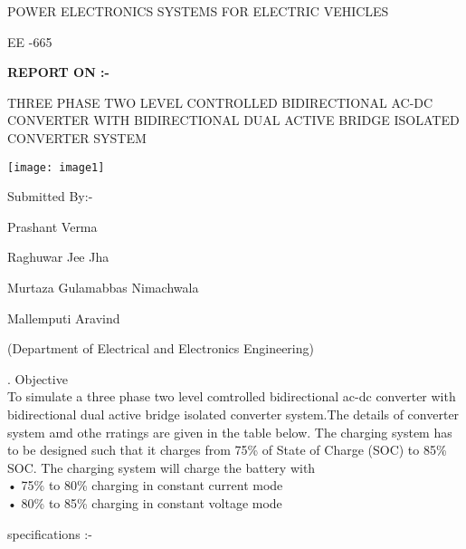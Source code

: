 \documentclass{article} %
\begin{document}
\begin{center}
\Large\noindent POWER ELECTRONICS SYSTEMS FOR ELECTRIC VEHICLES
\begin{center}
EE -665
\end{center}

\large
\noindent \textbf{  REPORT ON :- }

\noindent THREE PHASE TWO LEVEL CONTROLLED BIDIRECTIONAL AC-DC CONVERTER WITH BIDIRECTIONAL DUAL ACTIVE BRIDGE ISOLATED CONVERTER SYSTEM
\begin{center}
\texttt{[image: image1]}
\end{center}

\noindent Submitted By:-

\noindent Prashant Verma 
                        
                                          
\noindent Raghuwar Jee Jha


\noindent Murtaza Gulamabbas Nimachwala 


\noindent  Mallemputi Aravind




\noindent   (Department of Electrical and Electronics Engineering)\\
\end{center}

\newpage

\Large{}. Objective\\
\noindent To simulate a three phase two level comtrolled  bidirectional ac-dc converter with bidirectional dual active bridge isolated converter system.The details of converter system amd othe rratings are given in the table below. The charging system has to be designed such that it charges from 75\% of State of Charge (SOC) to 85\% SOC. The charging system will charge the battery with\\
• 75\% to 80\% charging in constant current mode\\
• 80\% to 85\% charging in constant voltage mode  

\noindent specifications :- 
\end{document}

